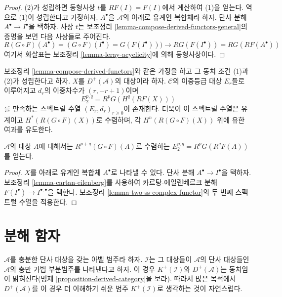 \begin{proof}
(2)가 성립하면 동형사상 $t$를 $RF(I) = F(I)$에서 계산하여 (1)을
얻는다. 역으로 (1)이 성립한다고 가정하자.
$A^\bullet$을 $\mathcal{A}$의 아래로 유계인 복합체라 하자.
단사 분해 $A^\bullet \to I^\bullet$을 택하자.
사상 $t$는 보조정리 \ref{lemma-compose-derived-functors-general}의 증명을
보면 다음 사상들로 주어진다.
$$
R(G \circ F)(A^\bullet) =
(G \circ F)(I^\bullet) =
G(F(I^\bullet))) \to
RG(F(I^\bullet)) =
RG(RF(A^\bullet))
$$
여기서 화살표는 보조정리 \ref{lemma-leray-acyclicity}에 의해
동형사상이다.
\end{proof}

\begin{lemma}
\label{lemma-grothendieck-spectral-sequence}
보조정리 \ref{lemma-compose-derived-functors}와 같은 가정을 하고 그 동치
조건 (1)과 (2)가 성립한다고 하자. $X$를 $D^{+}(\mathcal{A})$의
대상이라 하자. $\mathcal{C}$의 이중등급 대상 $E_r$들로 이루어지고
$d_r$의 이중차수가 $(r, - r + 1)$이며
$$
E_2^{p, q} = R^pG(H^q(RF(X)))
$$
를 만족하는 스펙트럴 수열 $(E_r, d_r)_{r \geq 0}$이 존재한다.
더욱이 이 스펙트럴 수열은 유계이고 $H^*(R(G \circ F)(X))$로 수렴하며,
각 $H^n(R(G \circ F)(X))$ 위에 유한 여과를 유도한다.
\end{lemma}

\noindent
$\mathcal{A}$의 대상 $A$에 대해서는 $R^{p + q}(G \circ F)(A)$로
수렴하는 $E_2^{p, q} = R^pG(R^qF(A))$를 얻는다.

\begin{proof}
$X$를 아래로 유계인 복합체 $A^\bullet$로 나타낼 수 있다.
단사 분해 $A^\bullet \to I^\bullet$을 택하자.
보조정리 \ref{lemma-cartan-eilenberg}를 사용하여
카르탕-에일렌베르크 분해
$F(I^\bullet) \to I^{\bullet, \bullet}$을 택한다.
보조정리 \ref{lemma-two-ss-complex-functor}의 두 번째 스펙트럴 수열을
적용한다.
\end{proof}

\section{분해 함자}
\label{section-derived-category}

\noindent
$\mathcal{A}$를 충분한 단사 대상을 갖는 아벨 범주라 하자.
$\mathcal{I}$는 그 대상들이 $\mathcal{A}$의 단사 대상들인
$\mathcal{A}$의 충만 가법 부분범주를 나타낸다고 하자.
이 경우 $K^{+}(\mathcal{I})$와 $D^{+}(\mathcal{A})$는 동치임이
밝혀진다(명제 \ref{proposition-derived-category}을 보라).
따라서 많은 목적에서 $D^{+}(\mathcal{A})$를 이 경우 더 이해하기 쉬운
범주 $K^{+}(\mathcal{I})$로 생각하는 것이 자연스럽다.

